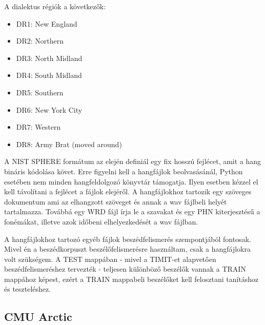 A dialektus régiók a következők:

\begin{multicols}{2}
	\begin{itemize}
		\item DR1:  New England
		\item DR2:  Northern
		\item DR3:  North Midland
		\item DR4:  South Midland
		\item DR5:  Southern
		\item DR6:  New York City
		\item DR7:  Western
		\item DR8:  Army Brat (moved around)
	\end{itemize}
\end{multicols}

A NIST SPHERE formátum az elején definiál egy fix hosszú fejlécet, amit a hang bináris kódolása követ. Erre figyelni kell a hangfájlok beolvasásánál, Python esetében nem minden hangfeldolgozó könyvtár támogatja. Ilyen esetben kézzel el kell távolítani a fejlécet a fájlok elejéről. A hangfájlokhoz tartozik egy szöveges dokumentum ami az elhangzott szöveget és annak a wav fájlbeli helyét tartalmazza. Továbbá egy WRD fájl írja le a szavakat és egy PHN kiterjesztésű a fonémákat, illetve azok időbeni elhelyezkedését a wav fájlban.

A hangfájlokhoz tartozó egyéb fájlok beszédfelismerés szempontjából fontosak. Mivel én a beszédkorpuszt beszélőfelismerésre használtam, csak a hangfájlokra volt szükségem. A TEST mappában - mivel a TIMIT-et alapvetően beszédfelismeréshez tervezték - teljesen különböző beszélők vannak a TRAIN mappához képest, ezért a TRAIN mappabeli beszélőket kell felosztani tanításhoz és teszteléshez.

\subsection{CMU Arctic}

